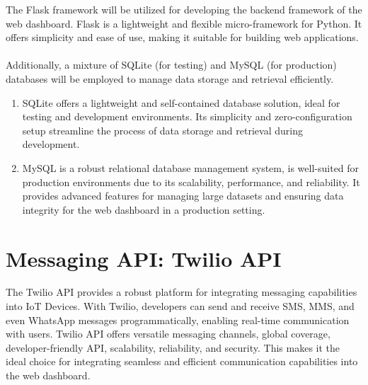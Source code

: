 \noindent The Flask framework will be utilized for developing the backend framework of the web dashboard. Flask is a lightweight and flexible micro-framework for Python. It offers simplicity and ease of use, making it suitable for building web applications. \\ \\
Additionally, a mixture of SQLite (for testing) and MySQL (for production) databases will be employed to manage data storage and retrieval efficiently. 
\begin{enumerate}
    \item SQLite offers a lightweight and self-contained database solution, ideal for testing and development environments. Its simplicity and zero-configuration setup streamline the process of data storage and retrieval during development.
    \item MySQL is a robust relational database management system, is well-suited for production environments due to its scalability, performance, and reliability. It provides advanced features for managing large datasets and ensuring data integrity for the web dashboard in a production setting.
\end{enumerate}

\section{Messaging API: Twilio API}
The Twilio API provides a robust platform for integrating messaging capabilities into IoT Devices. With Twilio, developers can send and receive SMS, MMS, and even WhatsApp messages programmatically, enabling real-time communication with users. Twilio API offers versatile messaging channels, global coverage, developer-friendly API, scalability, reliability, and security. This makes it the ideal choice for integrating seamless and efficient communication capabilities into the web dashboard.\\ \\

